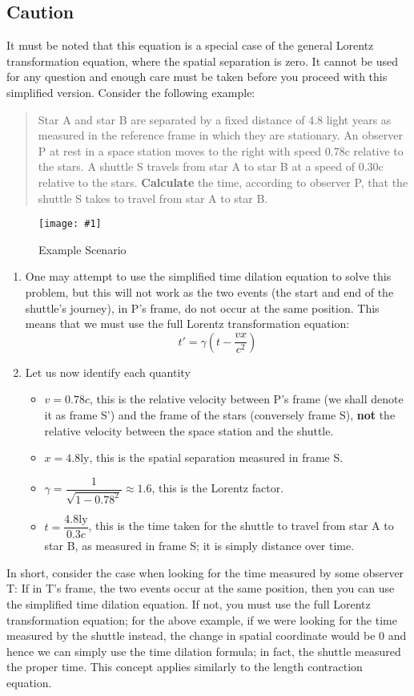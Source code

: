 \documentclass[a4paper,12pt]{article}
\newcommand{\img}[4]{\begin{center}
  \begin{figure}[H]
    \centering
    \texttt{[image: \#1]}
    \caption{#3}
    \label{fig:#4}
  \end{figure}
\end{center}}
\newcommand{\paren}[1]{\left(#1\right)}
\begin{document}
\subsection{Caution}
It must be noted that this equation is a special case of the general Lorentz transformation equation, where the spatial separation is zero. It cannot be used for any question and enough care must be taken before you proceed with this simplified version. Consider the following example:
\begin{quote}
  Star A and star B are separated by a fixed distance of 4.8 light years as measured in the
  reference frame in which they are stationary. An observer P at rest in a space station moves
  to the right with speed 0.78c relative to the stars. A shuttle S travels from star A to star B at a
  speed of 0.30c relative to the stars. \textbf{Calculate} the time, according to observer P, that the shuttle S takes to travel from star A
  to star B.
\end{quote}
\img{ex/eqcaution1.png}{0.85}{Example Scenario}{eqcaution1}
\begin{enumerate}
  \item One may attempt to use the simplified time dilation equation to solve this problem, but this will not work as the two events (the start and end of the shuttle's journey), in P's frame, do not occur at the same position. This means that we must use the full Lorentz transformation equation:
        $$t' = \gamma\paren{t - \frac{vx}{c^2}}$$
  \item Let us now identify each quantity
        \begin{itemize}
          \item $v = 0.78c$, this is the relative velocity between P's frame (we shall denote it as frame S') and the frame of the stars (conversely frame S), \textbf{not} the relative velocity between the space station and the shuttle.
          \item $x = 4.8\text{ly}$, this is the spatial separation measured in frame S.
          \item $\gamma = \dfrac{1}{\sqrt{1 - 0.78^2}} \approx 1.6$, this is the Lorentz factor.
          \item $t = \dfrac{4.8 \mathrm{ly}}{0.3c}$, this is the time taken for the shuttle to travel from star A to star B, as measured in frame S; it is simply distance over time.
        \end{itemize}
\end{enumerate}

In short, consider the case when looking for the time measured by some observer T: If in T's frame, the two events occur at the same position, then you can use the simplified time dilation equation. If not, you must use the full Lorentz transformation equation; for the above example, if we were looking for the time measured by the shuttle instead, the change in spatial coordinate would be 0 and hence we can simply use the time dilation formula; in fact, the shuttle measured the proper time. This concept applies similarly to the length contraction equation.
\end{document}
